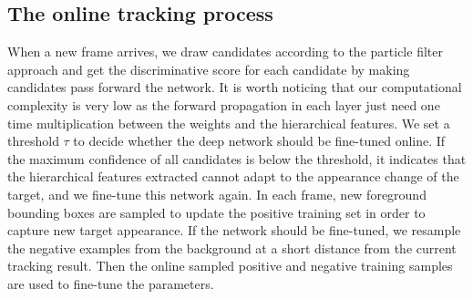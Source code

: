 \documentclass[preprint,12pt,review]{elsarticle}
\begin{document}
\subsection{The online tracking process}

When a new frame arrives, we draw candidates according to the particle filter approach and get the discriminative score for each candidate by making candidates pass forward the network.
It is worth noticing that our computational complexity is very low as the forward propagation in each layer just need one time multiplication between the weights and the hierarchical features.
We set a threshold $\tau$ to decide whether the deep network should be fine-tuned online.
If the maximum confidence of all candidates is below the threshold, it indicates that the hierarchical features extracted cannot adapt to the appearance change of the target, and we fine-tune this network again.
In each frame, new foreground bounding boxes are sampled to update the positive training set in order to capture new target appearance.
If the network should be fine-tuned, we resample the negative examples from the background at a short distance from the current tracking result.
Then the online sampled positive and negative training samples are used to fine-tune the parameters.
\end{document}
